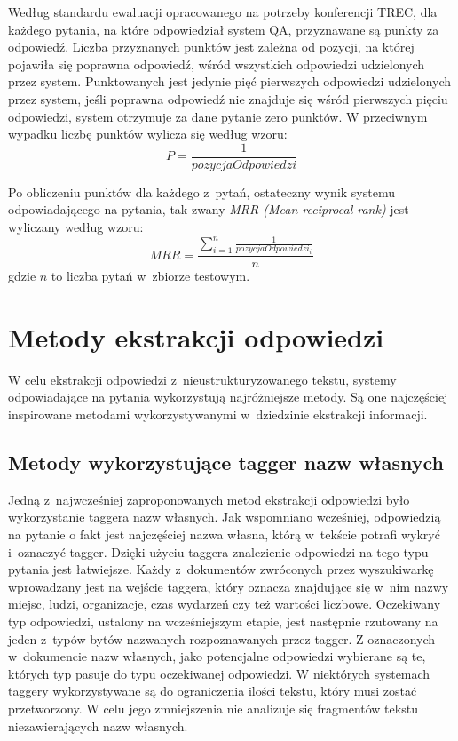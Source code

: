 \documentclass[a4paper, twoside, 12pt]{report}
\begin{document}
        Według standardu ewaluacji opracowanego na potrzeby konferencji TREC, dla każdego pytania, na które odpowiedział
        system QA, przyznawane są punkty za odpowiedź. Liczba przyznanych punktów jest zależna od pozycji, na której
        pojawiła się poprawna odpowiedź, wśród wszystkich odpowiedzi udzielonych przez system. Punktowanych jest
        jedynie pięć pierwszych odpowiedzi udzielonych przez system, jeśli poprawna odpowiedź nie znajduje się wśród
        pierwszych pięciu odpowiedzi, system otrzymuje za dane pytanie zero punktów. W przeciwnym wypadku liczbę punktów
        wylicza się według wzoru: $$ P = \frac{1}{pozycjaOdpowiedzi} $$

        Po obliczeniu punktów dla każdego z~pytań, ostateczny wynik systemu odpowiadającego na pytania, tak zwany
        \emph{MRR (Mean reciprocal rank)} jest wyliczany według wzoru:
        $$ MRR = \frac{\sum_{i=1}^{n} \frac{1}{pozycjaOdpowiedzi_i}}{n} $$
        gdzie \( n \) to liczba pytań w~zbiorze testowym\cite{QATESTCOLLECTION}.

    \section{Metody ekstrakcji odpowiedzi} \label{ANSWEREXTRACTION}
        W celu ekstrakcji odpowiedzi z~nieustrukturyzowanego tekstu, systemy odpowiadające na pytania wykorzystują
        najróżniejsze metody. Są one najczęściej inspirowane metodami wykorzystywanymi w~dziedzinie ekstrakcji informacji.

        \subsection{Metody wykorzystujące tagger nazw własnych}
            Jedną z~najwcześniej zaproponowanych metod ekstrakcji odpowiedzi było wykorzystanie taggera nazw własnych.
            Jak wspomniano wcześniej, odpowiedzią na pytanie o fakt jest najczęściej nazwa własna, którą w~tekście
            potrafi wykryć i~oznaczyć tagger. Dzięki użyciu taggera znalezienie odpowiedzi na tego typu pytania jest
            łatwiejsze.  Każdy z~dokumentów zwróconych przez wyszukiwarkę wprowadzany jest na wejście taggera, który
            oznacza znajdujące się w~nim nazwy miejsc, ludzi, organizacje, czas wydarzeń czy też wartości liczbowe.
            Oczekiwany typ odpowiedzi, ustalony na wcześniejszym etapie, jest następnie rzutowany na jeden z~typów
            bytów nazwanych rozpoznawanych przez tagger. Z oznaczonych w~dokumencie nazw własnych, jako potencjalne
            odpowiedzi wybierane są te, których typ pasuje do typu oczekiwanej odpowiedzi. W niektórych systemach
            taggery wykorzystywane są do ograniczenia ilości tekstu, który musi zostać przetworzony. W celu jego
            zmniejszenia nie analizuje się fragmentów tekstu niezawierających nazw własnych.
\end{document}
